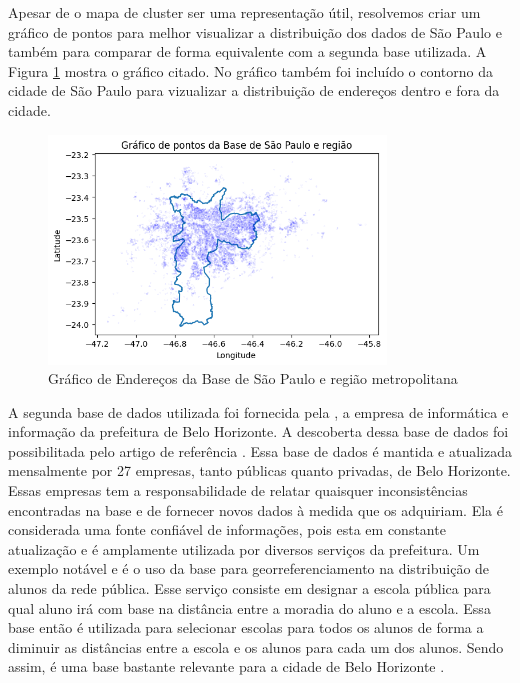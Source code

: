 Apesar de o mapa de cluster ser uma representação útil, resolvemos criar um gráfico de pontos para melhor visualizar a distribuição dos dados de São Paulo e também para comparar de forma equivalente com a segunda base utilizada. A Figura \ref{fig:baseSP} mostra o gráfico citado. No gráfico também foi incluído o contorno da cidade de São Paulo para vizualizar a distribuição de endereços dentro e fora da cidade.

\begin{figure} 
    \centering
    \includegraphics[width=0.8\textwidth]{Figuras/spCompleta.png}
    \caption{Gráfico de Endereços da Base de São Paulo e região metropolitana}
    \label{fig:baseSP}
\end{figure}

A segunda base de dados utilizada foi fornecida pela \cite{Prodabel}, a empresa de informática e informação da prefeitura de Belo Horizonte. A descoberta dessa base de dados foi possibilitada pelo artigo de referência \cite{Clodoveu2011}. Essa base de dados é mantida e atualizada mensalmente por 27 empresas, tanto públicas quanto privadas, de Belo Horizonte. Essas empresas tem a responsabilidade de relatar quaisquer inconsistências encontradas na base e de fornecer novos dados à medida que os adquiriam. Ela é considerada uma fonte confiável de informações, pois esta em constante atualização e é amplamente utilizada por diversos serviços da prefeitura. Um exemplo notável e
é o uso da base para georreferenciamento na distribuição de alunos da rede pública. Esse serviço consiste em designar a escola pública para qual aluno irá com base na distância entre a moradia do aluno e a escola. Essa base então é utilizada para selecionar escolas para todos os alunos de forma a diminuir as distâncias entre a escola e os alunos para cada um dos alunos. Sendo assim, é uma base bastante relevante para a cidade de Belo Horizonte \cite{Clodoveu2011}.

